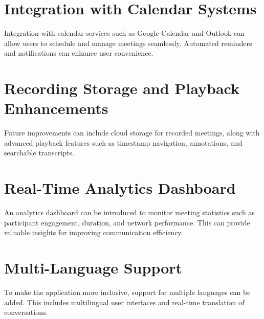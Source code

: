 \section{Integration with Calendar Systems}

Integration with calendar services such as Google Calendar and Outlook can allow users to schedule and manage meetings seamlessly. Automated reminders and notifications can enhance user convenience.

\section{Recording Storage and Playback Enhancements}

Future improvements can include cloud storage for recorded meetings, along with advanced playback features such as timestamp navigation, annotations, and searchable transcripts.

\section{Real-Time Analytics Dashboard}

An analytics dashboard can be introduced to monitor meeting statistics such as participant engagement, duration, and network performance. This can provide valuable insights for improving communication efficiency.

\section{Multi-Language Support}

To make the application more inclusive, support for multiple languages can be added. This includes multilingual user interfaces and real-time translation of conversations.
